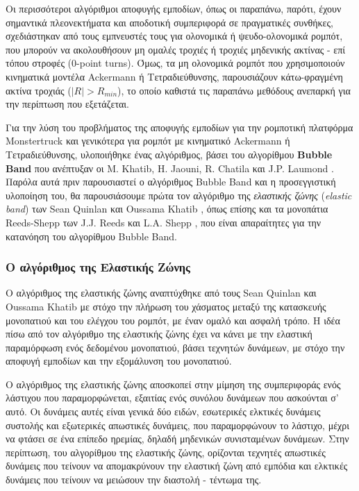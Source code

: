 \bigskip
Οι περισσότεροι αλγόριθμοι αποφυγής εμποδίων, όπως οι παραπάνω, παρότι, έχουν σημαντικά πλεονεκτήματα και αποδοτική συμπεριφορά σε πραγματικές συνθήκες, σχεδιάστηκαν από τους εμπνευστές τους για ολονομικά ή ψευδο-ολονομικά ρομπότ, που μπορούν να ακολουθήσουν μη ομαλές τροχιές ή τροχιές μηδενικής ακτίνας - επί τόπου στροφές (0-point turns). Όμως, τα μη ολονομικά ρομπότ που χρησιμοποιούν κινηματικά μοντέλα Ackermann ή Τετραδιεύθυνσης, παρουσιάζουν κάτω-φραγμένη ακτίνα τροχιάς ($|R| > R_{min}$), το οποίο καθιστά τις παραπάνω μεθόδους ανεπαρκή για την περίπτωση που εξετάζεται.

\bigskip
Για την λύση του προβλήματος της αποφυγής εμποδίων για την ρομποτική πλατφόρμα Monstertruck και γενικότερα για ρομπότ με κινηματικό Ackermann ή Τετραδιεύθυνσης, υλοποιήθηκε ένας αλγόριθμος, βάσει του αλγορίθμου \textbf{Bubble Band} που ανέπτυξαν οι M. Khatib, H. Jaouni, R. Chatila και J.P. Laumond \cite{dpm}. Παρόλα αυτά πριν παρουσιαστεί ο αλγόριθμος Bubble Band και η προσεγγιστική υλοποίηση του, θα παρουσιάσουμε πρώτα τον αλγόριθμο της \textit{ελαστικής ζώνης} (\textit{elastic band}) των Sean Quinlan και Oussama Khatib \cite{eband}, όπως επίσης και τα μονοπάτια Reeds-Shepp των J.J. Reeds και L.A. Shepp \cite{reeds_shepp}, που είναι απαραίτητες για την κατανόηση του αλγορίθμου Bubble Band.


\subsubsection{Ο αλγόριθμος της Ελαστικής Ζώνης} \label{sssec:eband}
Ο αλγόριθμος της ελαστικής ζώνης αναπτύχθηκε από τους Sean Quinlan και Oussama Khatib \cite{eband} με στόχο την πλήρωση του χάσματος μεταξύ της κατασκευής μονοπατιού και του ελέγχου του ρομπότ, με έναν ομαλό και ασφαλή τρόπο. Η ιδέα πίσω από τον αλγόριθμο της ελαστικής ζώνης έχει να κάνει με την ελαστική παραμόρφωση ενός δεδομένου μονοπατιού, βάσει τεχνητών δυνάμεων, με στόχο την αποφυγή εμποδίων και την εξομάλυνση του μονοπατιού.

\bigskip
Ο αλγόριθμος της ελαστικής ζώνης αποσκοπεί στην μίμηση της συμπεριφοράς ενός λάστιχου που παραμορφώνεται, εξαιτίας ενός συνόλου δυνάμεων που ασκούνται σ' αυτό. Οι δυνάμεις αυτές είναι γενικά δύο ειδών, εσωτερικές ελκτικές δυνάμεις συστολής και εξωτερικές απωστικές δυνάμεις, που παραμορφώνουν το λάστιχο, μέχρι να φτάσει σε ένα επίπεδο ηρεμίας, δηλαδή μηδενικών συνισταμένων δυνάμεων. Στην περίπτωση, του αλγορίθμου της ελαστικής ζώνης, ορίζονται τεχνητές απωστικές δυνάμεις που τείνουν να απομακρύνουν την ελαστική ζώνη από εμπόδια και ελκτικές δυνάμεις που τείνουν να  μειώσουν την διαστολή - τέντωμα της.

